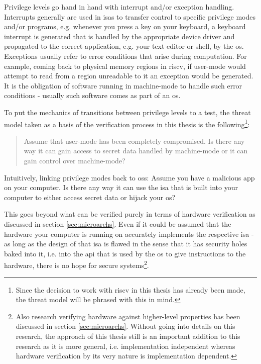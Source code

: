 Privilege levels go hand in hand with interrupt and/or exception handling.
Interrupts generally are used in \glspl{isa} to transfer control to specific privilege modes and/or programs, e.g. whenever you press a key on your keyboard, a keyboard interrupt is generated that is handled by the appropriate device driver and propagated to the correct application, e.g. your text editor or shell, by the \gls{os}.
Exceptions usually refer to error conditions that arise during computation.
For example, coming back to physical memory regions in \gls{riscv}, if user-mode would attempt to read from a region unreadable to it an exception would be generated.
It is the obligation of software running in machine-mode to handle such error conditions - usually such software comes as part of an \gls{os}.

To put the mechanics of transitions between privilege levels to a test, the threat model taken as a basis of the verification process in this thesis is the following\footnote{%
    Since the decision to work with \gls{riscv} in this thesis has already been made, the threat model will be phrased with this in mind.
}:
\begin{quote}
    Assume that user-mode has been completely compromised.
    Is there any way it can gain access to secret data handled by machine-mode or it can gain control over machine-mode?
\end{quote}

Intuitively, linking privilege modes back to \glspl{os}: Assume you have a malicious app on your computer.
Is there any way it can use the \gls{isa} that is built into your computer to either access secret data or hijack your \gls{os}?

This goes beyond what can be verified purely in terms of hardware verification as discussed in section \ref{sec:microarchs}.
Even if it could be assumed that the hardware your computer is running on accurately implements the respective \gls{isa} - as long as the design of that \gls{isa} is flawed in the sense that it has security holes baked into it, i.e. into the \gls{api} that is used by the \gls{os} to give instructions to the hardware, there is no hope for secure systems\footnote{%
    Also research verifying hardware against higher-level properties has been discussed in section \ref{sec:microarchs}.
    Without going into details on this research, the approach of this thesis still is an important addition to this research as it is more general, i.e. implementation independent whereas hardware verification by its very nature is implementation dependent.
}.

